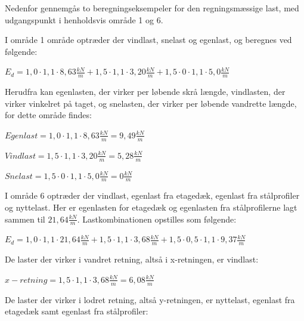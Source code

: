 Nedenfor gennemgås to beregningseksempeler for den regningsmæssige last, med udgangspunkt i henholdsvis område 1 og 6. 

I område 1 område optræder der vindlast, snelast og egenlast, og beregnes ved følgende:

\begin{center}
	$E_d = 1,\!0 \cdot 1,\!1 \cdot 8,\!63 \frac{kN}{m} + 1,\!5 \cdot 1,\!1 \cdot 3,\!20 \frac{kN}{m} + 1,\!5 \cdot 0 \cdot 1,\!1 \cdot 5,\!0 \frac{kN}{m}$
\end{center}

Herudfra kan egenlasten, der virker per løbende skrå længde, vindlasten, der virker vinkelret på taget, og snelasten, der virker per løbende vandrette længde, for dette område findes:

\begin{center}
	$Egenlast = 1,\!0 \cdot 1,\!1 \cdot 8,\!63 \frac{kN}{m} = 9,\!49 \frac{kN}{m}$
\end{center}

\begin{center}
	$Vindlast = 1,\!5 \cdot 1,\!1 \cdot 3,\!20 \frac{kN}{m} = 5,\!28 \frac{kN}{m}$
\end{center}

\begin{center}
	$Snelast = 1,\!5 \cdot 0 \cdot 1,\!1 \cdot 5,\!0 \frac{kN}{m} = 0 \frac{kN}{m}$ 
\end{center}

I område 6 optræder der vindlast, egenlast fra etagedæk, egenlast fra stålprofiler og nyttelast. Her er egenlasten for etagedæk og egenlasten fra stålprofilerne lagt sammen til $21,\!64 \frac{kN}{m}$. Lastkombinationen opstilles som følgende:

\begin{center}
	$E_d = 1,\!0 \cdot 1,\!1 \cdot 21,\!64 \frac{kN}{m} + 1,\!5 \cdot 1,\!1 \cdot 3,\!68 \frac{kN}{m} + 1,\!5 \cdot 0,\!5 \cdot 1,\!1 \cdot 9,\!37 \frac{kN}{m}$
\end{center}

De laster der virker i vandret retning, altså i x-retningen, er vindlast:

\begin{center}
	$x-retning = 1,\!5 \cdot 1,\!1 \cdot 3,\!68 \frac{kN}{m} = 6,\!08 \frac{kN}{m}$
\end{center}

De laster der virker i lodret retning, altså y-retningen, er nyttelast, egenlast fra etagedæk samt egenlast fra stålprofiler:

